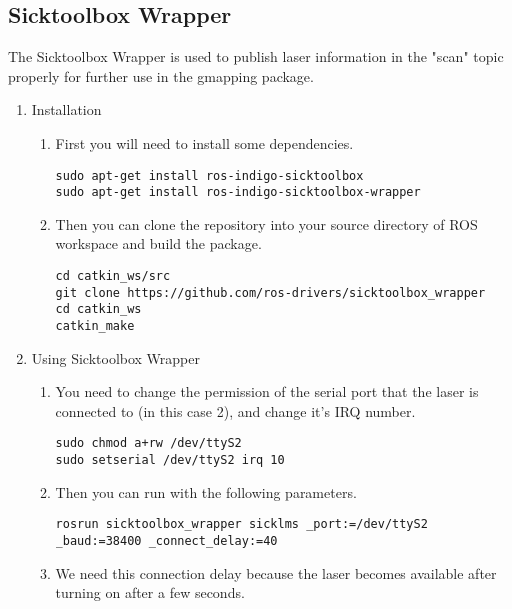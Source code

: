 \documentclass{article}
\begin{document}
\subsection{Sicktoolbox Wrapper}
The Sicktoolbox Wrapper is used to publish laser information in the "scan" topic
properly for further use in the gmapping package.
\begin{enumerate}

\item Installation
\begin{enumerate}
\item First you will need to install some dependencies.
\begin{lstlisting}
sudo apt-get install ros-indigo-sicktoolbox
sudo apt-get install ros-indigo-sicktoolbox-wrapper
\end{lstlisting}
\item Then you can clone the repository into your source directory of ROS
workspace and build the package.
\begin{lstlisting}
cd catkin_ws/src
git clone https://github.com/ros-drivers/sicktoolbox_wrapper
cd catkin_ws
catkin_make
\end{lstlisting}
\end{enumerate}

\item Using Sicktoolbox Wrapper
\begin{enumerate}
\item You need to change the permission of the serial port that the laser is
connected to (in this case 2), and change it's IRQ number.
\begin{lstlisting}
sudo chmod a+rw /dev/ttyS2
sudo setserial /dev/ttyS2 irq 10
\end{lstlisting}
\item Then you can run with the following parameters.
\begin{lstlisting}
rosrun sicktoolbox_wrapper sicklms _port:=/dev/ttyS2 _baud:=38400 _connect_delay:=40
\end{lstlisting}
\item We need this connection delay because the laser becomes available after
turning on after a few seconds.
\end{enumerate}
\end{enumerate}
\end{document}
